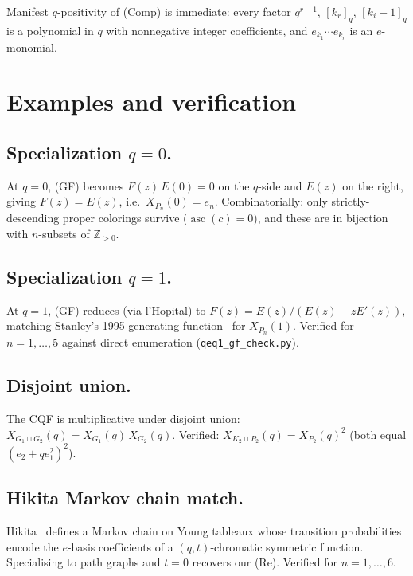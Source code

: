 \documentclass[11pt,a4paper]{amsart}
\theoremstyle{definition}
\DeclareMathOperator{\asc}{asc}
\newcommand{\CQF}{X}
\newcommand{\Path}{P}
\newcommand{\qint}[1]{[#1]_q}
\begin{document}
\smallskip
Manifest $q$-positivity of (Comp) is immediate: every factor
$q^{r-1}$, $\qint{k_r}$, $\qint{k_i - 1}$ is a polynomial in $q$ with
nonnegative integer coefficients, and $e_{k_1}\cdots e_{k_r}$ is an
$e$-monomial.

\section{Examples and verification}\label{sec:examples}

\subsection*{Specialization $q = 0$.}
At $q = 0$, (GF) becomes $F(z)\, E(0) = 0$ on the $q$-side and $E(z)$
on the right, giving $F(z) = E(z)$, i.e.\ $\CQF_{\Path_n}(0) = e_n$.
Combinatorially: only strictly-descending proper colorings survive
($\asc(c) = 0$), and these are in bijection with $n$-subsets of
$\mathbb{Z}_{>0}$.

\subsection*{Specialization $q = 1$.}
At $q = 1$, (GF) reduces (via l'Hopital) to
$F(z) = E(z) / (E(z) - z E'(z))$, matching Stanley's 1995 generating
function~\cite{Stanley1995} for $\CQF_{\Path_n}(1)$. Verified for
$n = 1, \ldots, 5$ against direct enumeration
(\texttt{qeq1\_gf\_check.py}).

\subsection*{Disjoint union.}
The CQF is multiplicative under disjoint union:
$\CQF_{G_1 \sqcup G_2}(q) = \CQF_{G_1}(q)\, \CQF_{G_2}(q)$.
Verified: $\CQF_{K_2 \sqcup \Path_2}(q) = \CQF_{\Path_2}(q)^2$
(both equal $(e_2 + q e_1^2)^2$).

\subsection*{Hikita Markov chain match.}
Hikita~\cite{Hikita2025} defines a Markov chain on Young tableaux whose
transition probabilities encode the $e$-basis coefficients of a
$(q,t)$-chromatic symmetric function. Specialising to path graphs and
$t = 0$ recovers our (Re). Verified for $n = 1, \ldots, 6$.
\end{document}
